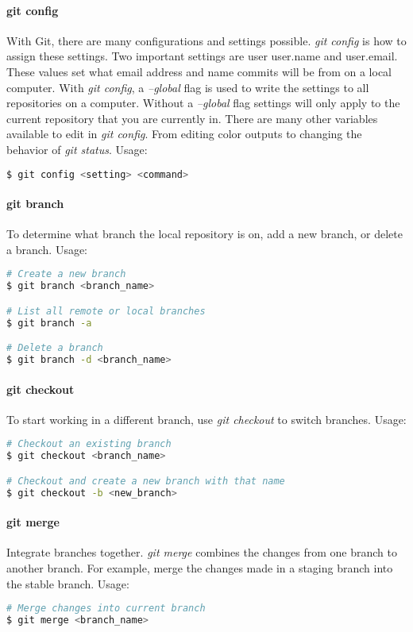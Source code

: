 \documentclass[a4paper]{report}
\begin{document}
\paragraph{git config}
With Git, there are many configurations and settings possible. \emph{git config} is how to assign these settings. Two important settings are user user.name and user.email. These values set what email address and name commits will be from on a local computer. With \emph{git config}, a \emph{--global} flag is used to write the settings to all repositories on a computer. Without a \emph{--global} flag settings will only apply to the current repository that you are currently in.
There are many other variables available to edit in \emph{git config}. From editing color outputs to changing the behavior of \emph{git status}.
Usage:
\begin{lstlisting}[language=bash]
$ git config <setting> <command>
\end{lstlisting}

\paragraph{git branch}
To determine what branch the local repository is on, add a new branch, or delete a branch.
Usage:
\begin{lstlisting}[language=bash]
# Create a new branch
$ git branch <branch_name>

# List all remote or local branches
$ git branch -a

# Delete a branch
$ git branch -d <branch_name>
\end{lstlisting}


\paragraph{git checkout}
To start working in a different branch, use \emph{git checkout} to switch branches.
Usage:
\begin{lstlisting}[language=bash]
# Checkout an existing branch
$ git checkout <branch_name>

# Checkout and create a new branch with that name
$ git checkout -b <new_branch>
\end{lstlisting}

\paragraph{git merge}
Integrate branches together. \emph{git merge} combines the changes from one branch to another branch. For example, merge the changes made in a staging branch into the stable branch.
Usage:
\begin{lstlisting}[language=bash]
# Merge changes into current branch
$ git merge <branch_name>
\end{lstlisting}
\end{document}
